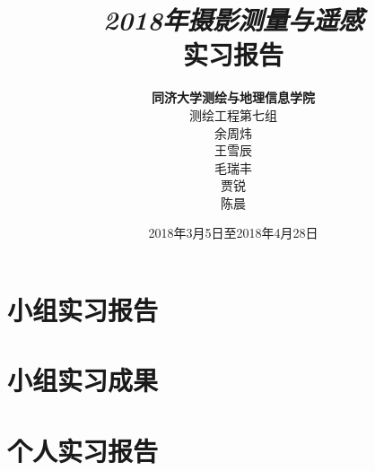 \documentclass[twoside,color=blue,mathpazo,titlestyle=hang,10pt]{elegantbook}
\title{\Huge\emph{2018年摄影测量与遥感}\\实习报告}
\author
{
\Large\textbf{同济大学测绘与地理信息学院} \\
测绘工程\quad 第七组 \\
余周炜\quad 1551126 \\
王雪辰\quad 1551140\\
毛瑞丰\quad 1551175\\
贾\hspace{1em}锐\quad 1551181\\
陈\hspace{1em}晨\quad 1551156
}
\date{2018年3月5日至2018年4月28日}
\numberwithin{equation}{section}
\begin{document}
\frontmatter

\maketitle


\tableofcontents

\mainmatter

\part{小组实习报告}


\part{小组实习成果}

\part{个人实习报告}





% 
% 


% 
% 
\end{document}
